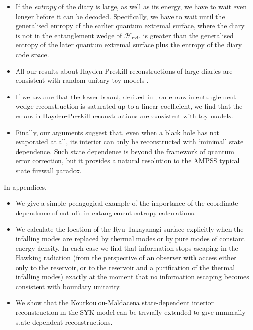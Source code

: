 \documentclass[11pt,a4paper]{article}
\begin{document}
\begin{itemize}
\item If the \emph{entropy} of the diary is large, as well as its energy, we have to wait even longer before it can be decoded. Specifically, we have to wait until the generalised entropy of the earlier quantum extremal surface, where the diary is not in the entanglement wedge of $\mathcal{H}_\text{rad}$, is greater than the generalised entropy of the later quantum extremal surface plus the entropy of the diary code space. 

\item All our results about Hayden-Preskill reconstructions of large diaries are consistent with random unitary toy models \cite{hayden2018learning}.

\item If we assume that the lower bound, derived in \cite{hayden2018learning}, on errors in entanglement wedge reconstruction is saturated up to a linear coefficient, we find that the errors in Hayden-Preskill reconstructions are consistent with toy models.

\item Finally, our arguments suggest that, even when a black hole has not evaporated at all, its interior can only be reconstructed with `minimal' state dependence. Such state dependence is beyond the framework of quantum error correction, but it provides a natural resolution to the AMPSS typical state firewall paradox.
\end{itemize}
In appendices,
\begin{itemize}
\item We give a simple pedagogical example of the importance of the coordinate dependence of cut-offs in entanglement entropy calculations.

\item We calculate the location of the Ryu-Takayanagi surface explicitly when the infalling modes are replaced by thermal modes or by pure modes of constant energy density. In each case we find that information stops escaping in the Hawking radiation (from the perspective of an observer with access either only to the reservoir, or to the reservoir and a purification of the thermal infalling modes) exactly at the moment that no information escaping becomes consistent with boundary unitarity.

\item We show that the Kourkoulou-Maldacena state-dependent interior reconstruction in the SYK model can be trivially extended to give minimally state-dependent reconstructions.
\end{itemize}
\end{document}
